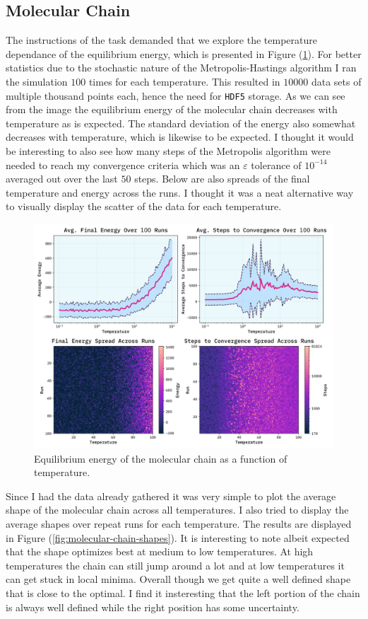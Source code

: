 \documentclass[10pt, titlepage, a4paper]{article}
\begin{document}
\subsection{Molecular Chain}
The instructions of the task demanded that we explore the temperature dependance of the equilibrium energy, which is presented in Figure 
(\ref{fig:molecular-energy}). For better statistics due to the stochastic nature of the Metropolis-Hastings algorithm I ran the simulation
$100$ times for each temperature. This resulted in $10000$ data sets of multiple thousand points each, hence the need for \texttt{HDF5} storage.
As we can see from the image the equilibrium energy of the molecular chain decreases with temperature as is expected. The standard deviation 
of the energy also somewhat decreases with temperature, which is likewise to be expected. I thought it would be interesting to also see how many 
steps of the Metropolis algorithm were needed to reach my convergence criteria which was an $\varepsilon$ tolerance of $10^{-14}$ averaged out 
over the last $50$ steps. Below are also spreads of the final temperature and energy across the runs. I thought it was a neat alternative way 
to visually display the scatter of the data for each temperature.

\begin{figure}[H]
    \centering
    \includegraphics[width=.95\textwidth]{../MolecularChain2/Images/avgE-vs-T.png}
    \caption{Equilibrium energy of the molecular chain as a function of temperature.}
    \label{fig:molecular-energy}
\end{figure}

Since I had the data already gathered it was very simple to plot the average shape of the molecular chain across all temperatures. I also tried to 
display the average shapes over repeat runs for each temperature. The results are displayed in Figure (\ref{fig:molecular-chain-shapes}). It is 
interesting to note albeit expected that the shape optimizes best at medium to low temperatures. At high temperatures the chain can 
still jump around a lot and at low temperatures it can get stuck in local minima. Overall though we get quite a well defined shape that is close 
to the optimal. I find it insteresting that the left portion of the chain is always well defined while the right position has some uncertainty.
\end{document}
